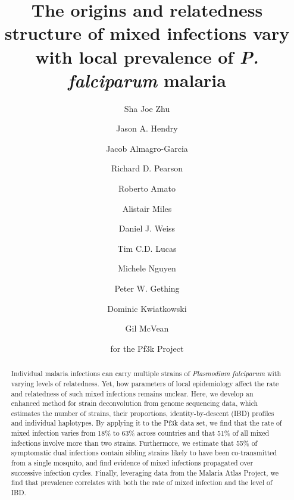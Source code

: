 \documentclass[9pt,lineno]{elife}
\begin{document}
\title{The origins and relatedness structure of mixed infections vary with local prevalence of {\it P. falciparum} malaria}
\newcommand\shorttitle{Mixed infections in malaria}
\date{}

\author[1$\dagger$]{Sha Joe Zhu}
\author[1$\dagger$]{Jason A. Hendry}
\author[1,2,3,4]{Jacob Almagro-Garcia}

\author[2,3,4]{Richard D. Pearson}
\author[2,3,4]{Roberto Amato}
\author[1,2,3,4]{Alistair Miles}

\author[1]{Daniel J. Weiss}
\author[1]{Tim C.D. Lucas}
\author[1]{Michele Nguyen}


\author[1]{Peter W. Gething}
\author[1,2,3,4]{Dominic Kwiatkowski}
\author[1,3*]{Gil McVean}

\author[5]{for the Pf3k Project}



\maketitle{}

\begin{abstract}
Individual malaria infections can carry multiple strains of {\it Plasmodium falciparum} with varying levels of relatedness.  Yet, how parameters of local epidemiology affect the rate and relatedness of such mixed infections remains unclear.  Here, we develop an enhanced method for strain deconvolution from genome sequencing data, which estimates the number of strains, their proportions, identity-by-descent (IBD) profiles and individual haplotypes.  By applying it to the Pf3k data set, we find that the rate of mixed infection varies from 18\% to 63\% across countries and that 51\% of all mixed infections involve more than two strains.  Furthermore, we estimate that 55\% of symptomatic dual infections contain sibling strains likely to have been co-transmitted from a single mosquito, and find evidence of mixed infections propagated over successive infection cycles.  Finally, leveraging data from the Malaria Atlas Project, we find that prevalence correlates with both the rate of mixed infection and the level of IBD.
\end{abstract}
\end{document}
